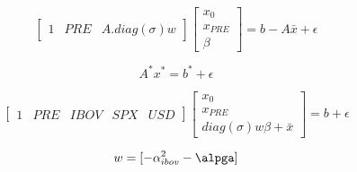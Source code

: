 \documentclass[11pt, letterpaper]{article}
\begin{document}
	\begin{equation}
		\begin{bmatrix}
			1 & PRE & A.diag(\sigma) w
		\end{bmatrix}
		\begin{bmatrix}
			x_0 \\
			x_{PRE} \\
			\beta
		\end{bmatrix} =  b - A \bar{x}+ \epsilon
	\end{equation}


	\begin{equation}
		A^* x^* = b^* + \epsilon
	\end{equation}

	\begin{equation}
		\begin{bmatrix}
			1 & PRE & IBOV & SPX & USD
		\end{bmatrix}
		\begin{bmatrix}
			x_0 \\
			x_{PRE} \\
			diag(\sigma) w \beta + \bar{x}
		\end{bmatrix} = b + \epsilon
	\end{equation}

	\pagebreak
	\begin{equation}
		w = [ -\alpha_{ibov}^2  -\alpga]
	\end{equation}
\end{document}
